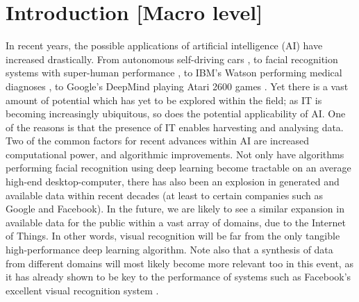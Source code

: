 
\chapter{Introduction [Macro level]}\label{chpt:intro}


In recent years, the possible applications of artificial intelligence (AI) have increased drastically. From autonomous self-driving cars \citep{Urmson2009}, to facial recognition systems with super-human performance \citep{Sun2014}, to IBM's Watson performing medical diagnoses \citep{Wagle2013}, to Google's DeepMind playing Atari 2600 games \citep{Mnih2015}. Yet there is a vast amount of potential which has yet to be explored within the field; as IT is becoming increasingly ubiquitous, so does the potential applicability of AI. One of the reasons is that the presence of IT enables harvesting and analysing data. Two of the common factors for recent advances within AI are increased computational power, and algorithmic improvements. Not only have algorithms performing facial recognition using deep learning become tractable on an average high-end desktop-computer, there has also been an explosion in generated and available data within recent decades (at least to certain companies such as Google and Facebook). In the future, we are likely to see a similar expansion in available data for the public within a vast array of domains, due to the Internet of Things. In other words, visual recognition will be far from the only tangible high-performance deep learning algorithm. Note also that a synthesis of data from different domains will most likely become more relevant too in this event, as it has already shown to be key to the performance of systems such as Facebook's excellent visual recognition system \citep{}.
\\

